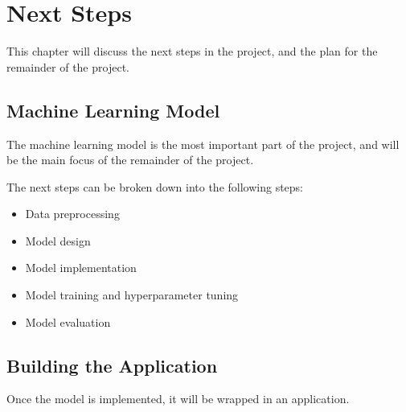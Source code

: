 \chapter{Next Steps}
This chapter will discuss the next steps in the project, and the plan for the remainder of the project.

\begingroup
\let\clearpage\relax

\section{Machine Learning Model}
The machine learning model is the most important part of the project, and will be the main focus of the remainder of the project.

The next steps can be broken down into the following steps:
\begin{itemize}
    \item Data preprocessing
    \item Model design
    \item Model implementation
    \item Model training and hyperparameter tuning
    \item Model evaluation
\end{itemize}

\section{Building the Application}
Once the model is implemented, it will be wrapped in an application.

\endgroup